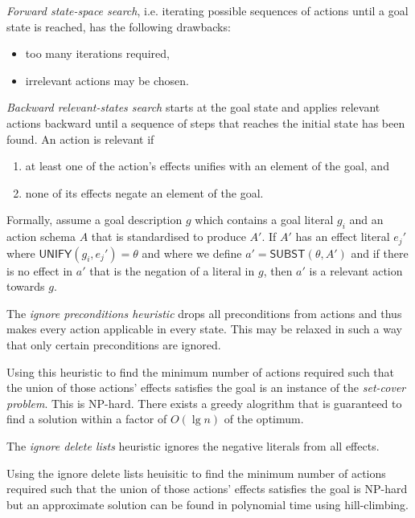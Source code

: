 \documentclass{article}
\begin{document}
\begin{theorem}[R\&N, p. 373]
    \emph{Forward state-space search}, i.e. iterating possible sequences of 
    actions until a goal state is reached, has the following drawbacks:
    \begin{itemize}
        \item too many iterations required,
        \item irrelevant actions may be chosen.
    \end{itemize}
\end{theorem}

\begin{definition}
    \emph{Backward relevant-states search} starts at the goal state and applies
    relevant actions backward until a sequence of steps that reaches the initial 
    state has been found. An action is relevant if
    \begin{enumerate}
        \item at least one of the action's effects unifies with an element of the goal, and
        \item none of its effects negate an element of the goal.
    \end{enumerate}
    Formally, assume a goal description $g$
    which contains a goal literal $g_i$ and an action schema $A$ that is standardised
    to produce $A'$. If $A'$ has an effect literal $e_j'$ where $\textsf{UNIFY}(g_i,e_j')=\theta$
    and where we define $a'=\textsf{SUBST}(\theta, A')$ and if there is no effect in
    $a'$ that is the negation of a literal in $g$, then $a'$ is a relevant action towards 
    $g$. 
\end{definition}

\begin{theorem}[R\&N p. 376]
    The \emph{ignore preconditions heuristic} drops all preconditions from actions
    and thus makes every action applicable in every state. This may be relaxed in
    such a way that only certain preconditions are ignored.

    Using this heuristic to find the minimum number of 
    actions required such that the union of those actions'
    effects satisfies the goal is an instance of the \emph{set-cover problem}. This
    is NP-hard. There exists a greedy alogrithm that is guaranteed to find a solution
    within a factor of $O(\lg n)$ of the optimum.
\end{theorem}

\begin{theorem}[R\&N p. 377]
    The \emph{ignore delete lists} heuristic ignores the negative literals from all
    effects.

    Using the ignore delete lists heuisitic to find the minimum number of actions 
    required such that the union of those actions' effects satisfies the goal 
    is NP-hard but an approximate solution can be found in polynomial time using
    hill-climbing.
\end{theorem}
\end{document}
